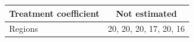 \begingroup
\centering
\begin{tabular}{lc}
\toprule
Treatment coefficient & Not estimated\\
\midrule
Regions & 20, 20, 20, 17, 20, 16\\
\bottomrule
\end{tabular}
\par\endgroup

